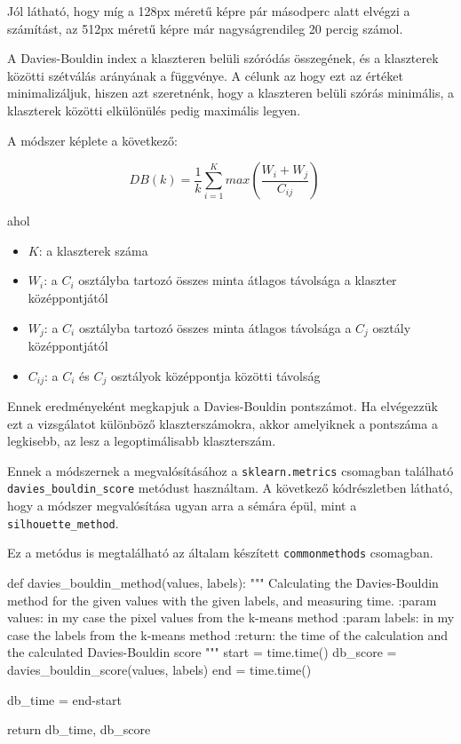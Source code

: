 Jól látható, hogy míg a 128px méretű képre pár másodperc alatt elvégzi a számítást, az 512px méretű képre már nagyságrendileg 20 percig számol.

A Davies-Bouldin index a klaszteren belüli szóródás összegének, és a klaszterek közötti szétválás arányának a függvénye. A célunk az hogy ezt az értéket minimalizáljuk, hiszen azt szeretnénk, hogy a klaszteren belüli szórás minimális, a klaszterek közötti elkülönülés pedig maximális legyen.

A módszer képlete a következő:

\[ DB(k)=\frac{1}{k} \sum_{i=1}^{K} max \left(\frac{W_i + W_j}{C_{ij}}\right)  \quad \]

\noindent ahol
\begin{itemize}
\item $K$: a klaszterek száma
\item $W_i$: a $C_i$ osztályba tartozó összes minta átlagos távolsága a klaszter középpontjától
\item $W_{j}$: a $C_i$ osztályba tartozó összes minta átlagos távolsága a $C_j$ osztály középpontjától
\item $C_{ij}$: a $C_i$ és $C_j$ osztályok középpontja közötti távolság
\end{itemize}
Ennek eredményeként megkapjuk a Davies-Bouldin pontszámot. Ha elvégezzük ezt a vizsgálatot különböző klaszterszámokra, akkor amelyiknek a pontszáma a legkisebb, az lesz a legoptimálisabb klaszterszám. \cite{tomatoleaf}

Ennek a módszernek a megvalósításához a \texttt{sklearn.metrics} csomagban található \texttt{davies\_bouldin\_score} metódust használtam. A következő kódrészletben látható, hogy a módszer megvalósítása ugyan arra a sémára épül, mint a \texttt{silhouette\_method}.

Ez a metódus is megtalálható az általam készített \texttt{commonmethods} csomagban.
\begin{python}
def davies_bouldin_method(values, labels):
    """
    Calculating the Davies-Bouldin method for the given values with
    the given labels, and measuring time.
    :param values: in my case the pixel values from the k-means method
    :param labels: in my case the labels from the k-means method
    :return: the time of the calculation and
        the calculated Davies-Bouldin score
    """
    start = time.time()
    db_score = davies_bouldin_score(values, labels)
    end = time.time()

    db_time = end-start

    return db_time, db_score
\end{python}

